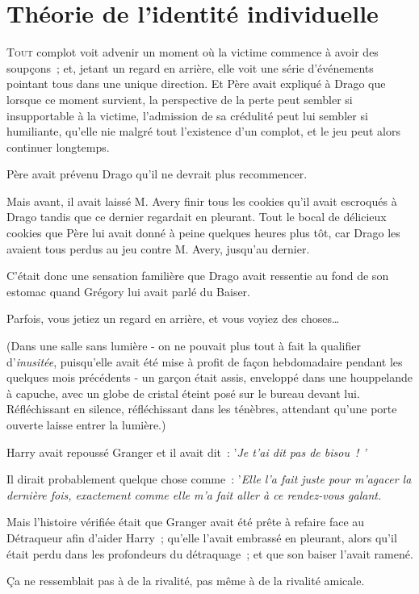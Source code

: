 \chapter{Théorie de l'identité individuelle}

\lettrine{T}{out} complot voit advenir un moment où la victime commence à avoir des soupçons~; et, jetant un regard en arrière, elle voit une série d'événements pointant tous dans une unique direction. Et Père avait expliqué à Drago que lorsque ce moment survient, la perspective de la perte peut sembler si insupportable à la victime, l'admission de sa crédulité peut lui sembler si humiliante, qu'elle nie malgré tout l'existence d'un complot, et le jeu peut alors continuer longtemps.

Père avait prévenu Drago qu'il ne devrait plus recommencer.

Mais avant, il avait laissé M. Avery finir tous les cookies qu'il avait escroqués à Drago tandis que ce dernier regardait en pleurant. Tout le bocal de délicieux cookies que Père lui avait donné à peine quelques heures plus tôt, car Drago les avaient tous perdus au jeu contre M. Avery, jusqu'au dernier.

C'était donc une sensation familière que Drago avait ressentie au fond de son estomac quand Grégory lui avait parlé du Baiser.

Parfois, vous jetiez un regard en arrière, et vous voyiez des choses…

(Dans une salle sans lumière - on ne pouvait plus tout à fait la qualifier d'\emph{inusitée}, puisqu'elle avait été mise à profit de façon hebdomadaire pendant les quelques mois précédents - un garçon était assis, enveloppé dans une houppelande à capuche, avec un globe de cristal éteint posé sur le bureau devant lui. Réfléchissant en silence, réfléchissant dans les ténèbres, attendant qu'une porte ouverte laisse entrer la lumière.)

Harry avait repoussé Granger et il avait dit~: '\emph{Je t'ai dit pas de bisou~! '}

Il dirait probablement quelque chose comme~: '\emph{Elle l'a fait juste pour m'agacer la dernière fois, exactement comme elle m'a fait aller à ce rendez-vous galant.}

Mais l'histoire vérifiée était que Granger avait été prête à refaire face au Détraqueur afin d'aider Harry~; qu'elle l'avait embrassé en pleurant, alors qu'il était perdu dans les profondeurs du détraquage~; et que son baiser l'avait ramené.

Ça ne ressemblait pas à de la rivalité, pas même à de la rivalité amicale.

